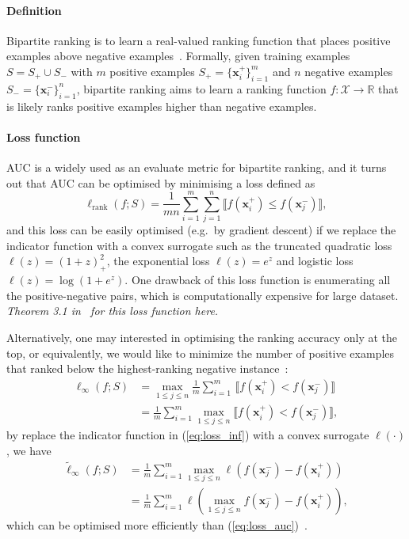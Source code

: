 \documentclass[9pt]{extarticle}
\newcommand{\llb}{\llbracket}
\newcommand{\rrb}{\rrbracket}
\newcommand{\x}{\mathbf{x}}
\newcommand{\1}{\mathbf{1}}
\newcommand{\R}{\mathbb{R}}
\newcommand{\XCal}{\mathcal{X}}
\newcommand{\eg}{e.g.\ }
\begin{document}
\paragraph{Definition} 
Bipartite ranking is to learn a real-valued ranking function that places positive examples above negative examples~\cite{li:2014}.
Formally, given training examples $S = S_+ \cup S_-$ with $m$ positive examples $S_+ = \{\x_i^+\}_{i=1}^m$ and $n$ negative examples $S_- = \{\x_i^-\}_{i=1}^n$, 
bipartite ranking aims to learn a ranking function $f: \XCal \to \R$ that is likely ranks positive examples higher than negative examples.

\paragraph{Loss function}
AUC is a widely used as an evaluate metric for bipartite ranking, and it turns out that AUC can be optimised by minimising a loss defined as~\cite{cortes:2004}
\begin{equation}
\label{eq:loss_auc}
\ell_\text{rank}(f; S) = \frac{1}{mn} \sum_{i=1}^m \sum_{j=1}^n \llb f(\x_i^+) \le f(\x_j^-) \rrb,
\end{equation}
and this loss can be easily optimised (\eg by gradient descent) if we replace the indicator function with a convex surrogate such as the truncated quadratic loss 
$\ell(z) = (1+z)_+^2$, the exponential loss $\ell(z) = e^z$ and logistic loss $\ell(z) = \log(1+e^z)$.
One drawback of this loss function is enumerating all the positive-negative pairs, which is computationally expensive for large dataset. \\
\emph{Theorem 3.1 in~\cite{dembczynski:2010} for this loss function here.}

Alternatively, one may interested in optimising the ranking accuracy only at the top, 
or equivalently, we would like to minimize the number of positive examples that ranked below the highest-ranking negative instance~\cite{agarwal:2011,li:2014}:
\begin{equation}
\label{eq:loss_inf}
\begin{aligned}
\ell_{\infty}(f; S) 
&= \max_{1 \le j \le n} \frac{1}{m} \sum_{i=1}^m \, \llb f(\x_i^+) < f(\x_j^-) \rrb \\
&= \frac{1}{m} \sum_{i=1}^m \max_{1 \le j \le n} \llb f(\x_i^+) < f(\x_j^-) \rrb,
\end{aligned}
\end{equation}
by replace the indicator function in (\ref{eq:loss_inf}) with a convex surrogate $\ell(\cdot)$, we have
\begin{equation}
\label{eq:loss_inf1} 
\begin{aligned}
\tilde{\ell}_{\infty}(f; S) 
&= \frac{1}{m} \sum_{i=1}^m \max_{1 \le j \le n} \ell\left( f(\x_j^-) - f(\x_i^+) \right) \\
&= \frac{1}{m} \sum_{i=1}^m \ell\left( \max_{1 \le j \le n} f(\x_j^-) - f(\x_i^+) \right),
\end{aligned}
\end{equation}
which can be optimised more efficiently than (\ref{eq:loss_auc})~\cite{li:2014}.
\end{document}

